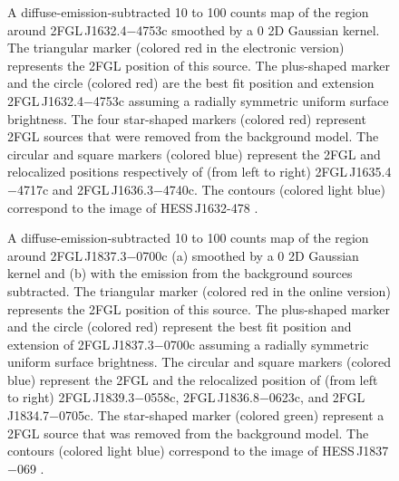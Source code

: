 \documentclass[12pt,preprint]{aastex}
\newif\ifcolorfigure
\newcommand{\gev}{\text{GeV}\xspace}
\newcommand{\tev}{\text{TeV}\xspace}
\begin{document}
\begin{figure}
    \ifcolorfigure
      \plotone{source_plots/source_HESS_J1632-478_color.eps}
    \else
    \fi
  \caption{A diffuse-emission-subtracted 10 \gev to 100 \gev counts map of
  the region around 2FGL\,J1632.4$-$4753c smoothed by a 0 2D Gaussian
  kernel.  The triangular marker (colored red in the electronic version)
  represents the 2FGL position of this source.  The plus-shaped marker
  and the circle (colored red) are the best fit position and extension
  2FGL\,J1632.4$-$4753c assuming a radially symmetric uniform surface
  brightness.  The four star-shaped markers (colored red) represent 2FGL
  sources that were removed from the background model.  The circular
  and square markers (colored blue) represent the 2FGL and relocalized
  positions respectively of (from left to right) 2FGL\,J1635.4$-$4717c
  and 2FGL\,J1636.3$-$4740c.  
  The contours (colored light blue) correspond to the \tev image of
  HESS\,J1632-478 \citep{hess_plane_survey}.
  }\label{1FGL_J1632.9-4802c}
\end{figure}


\begin{figure}
    \ifcolorfigure
      \plotone{source_plots/source_HESS_J1837-069_color.eps}
    \else
    \fi
  \caption{
  A diffuse-emission-subtracted 10 \gev to 100 \gev counts map of the
  region around 2FGL\,J1837.3$-$0700c (a) smoothed by a 0 2D Gaussian
  kernel and (b) with the emission from the background sources subtracted.
  The triangular marker (colored red in the online version) represents
  the 2FGL
  position of this source. The plus-shaped marker and 
  the circle (colored red) represent
  the best fit position and extension of 2FGL\,J1837.3$-$0700c assuming a
  radially symmetric uniform surface brightness. The circular
  and square markers 
  (colored blue) represent the 2FGL and the relocalized position of
  (from left to right) 2FGL\,J1839.3$-$0558c, 2FGL\,J1836.8$-$0623c,
  and 2FGL\,J1834.7$-$0705c.  The star-shaped marker 
  (colored green) represent a
  2FGL source that was removed from the background model.  
  The contours (colored light blue) correspond to the \tev image of
  HESS\,J1837$-$069
  \citep{hess_plane_survey}.}\label{1FGL_J1837.5-0659c}
\end{figure}
\end{document}

